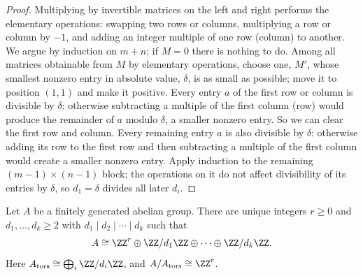 \begin{proof}
Multiplying by invertible matrices on the left and right performs the elementary
operations: swapping two rows or columns, multiplying a row or column by $-1$, and
adding an integer multiple of one row (column) to another. We argue by induction on
$m + n$; if $M = 0$ there is nothing to do. Among all matrices obtainable from $M$ by
elementary operations, choose one, $M'$, whose smallest nonzero entry in absolute
value, $\delta$, is as small as possible; move it to position $(1,1)$ and make it
positive. Every entry $a$ of the first row or column is divisible by $\delta$: otherwise
subtracting a multiple of the first column (row) would produce the remainder of $a$
modulo $\delta$, a smaller nonzero entry. So we can clear the first row and column.
Every remaining entry $a$ is also divisible by $\delta$: otherwise adding its row to the
first row and then subtracting a multiple of the first column would create a smaller
nonzero entry. Apply induction to the remaining $(m-1) \times (n-1)$ block; the
operations on it do not affect divisibility of its entries by $\delta$, so $d_1 = \delta$
divides all later $d_i$.
\end{proof}

\begin{theorem}\label{groups:theorem-structure-abelian}
Let $A$ be a finitely generated abelian group. There are unique integers
$r \geq 0$ and $d_1, \ldots, d_k \geq 2$ with $d_1 \mid d_2 \mid \cdots \mid d_k$ such that
\[
A \cong \ZZ^r \oplus \ZZ/d_1\ZZ \oplus \cdots \oplus \ZZ/d_k\ZZ.
\]
Here $A_{\mathrm{tors}} \cong \bigoplus_i \ZZ/d_i\ZZ$, and $A/A_{\mathrm{tors}} \cong \ZZ^r$.
\end{theorem}

